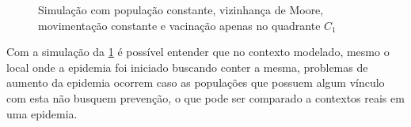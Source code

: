 \documentclass[a4paper,12pt]{article}
\begin{document}
\begin{figure}[!ht]
\qquad
{}
\qquad
{}
\caption{Simulação com população constante, vizinhança de Moore, movimentação constante e vacinação apenas no quadrante $C_1$}
\label{figure:vac2moore}
\end{figure}

Com a simulação da \ref{figure:vac2moore} é possível entender que no contexto modelado, mesmo o local onde a epidemia foi iniciado buscando conter a mesma, problemas de aumento da epidemia ocorrem caso as populações que possuem algum vínculo com esta não busquem prevenção, o que pode ser comparado a contextos reais em uma epidemia.
\end{document}
